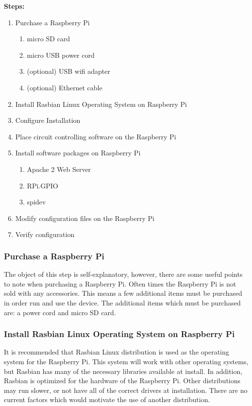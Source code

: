 \documentclass{article}	%
\begin{document}
\begin{multicols}{2}
\textbf{Steps:}
\begin{enumerate}
\item Purchase a Raspberry Pi
    \begin{enumerate}
    \item micro SD card
    \item micro USB power cord
    \item (optional) USB wifi adapter
    \item (optional) Ethernet cable
    \end{enumerate}
\item Install Rasbian Linux Operating System on Raspberry Pi
\item Configure Installation
\item Place circuit controlling software on the Raspberry Pi
\item Install software packages on Raspberry Pi
    \begin{enumerate}
    \item Apache 2 Web Server
    \item RPi.GPIO
    \item spidev
    \end{enumerate}
\item Modify configuration files on the Raspberry Pi
\item Verify configuration
\end{enumerate}

\subsubsection{Purchase a Raspberry Pi}
The object of this step is self-explanatory, however,
there are some useful points to note when purchasing
a Raspberry Pi.
Often times the Raspberry Pi is not sold with any accessories.
This means a few additional items must be purchased
in order run and use the device.
The additional items which must be purchased are:
a power cord and
micro SD card.

\subsubsection{Install Rasbian Linux Operating System on Raspberry Pi}
It is recommended that Rasbian Linux distribution is used
as the operating system for the Raspberry Pi.
This system will work with other operating systems,
but Rasbian has many of the necessary libraries available
at install.
In addition, Rasbian is optimized for the hardware of the Raspberry Pi.
Other distributions may run slower, or
not have all of the correct drivers at installation.
There are no current factors which would motivate the
use of another distribution.


\end{multicols}
\end{document}
